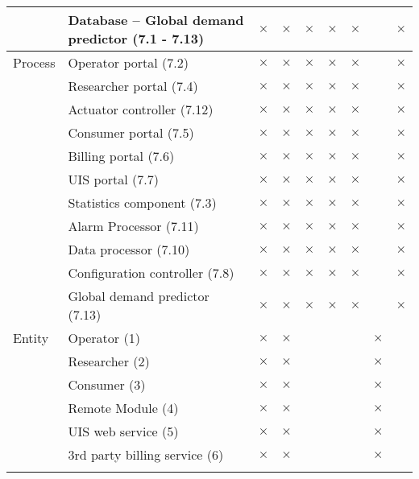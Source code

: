 \begin{longtable}{p{2.3cm} p{9cm} p{0.2cm} p{0.2cm} p{0.2cm} p{0.2cm}p{0.2cm} p{0.2cm} p{0.2cm} }
			&  Database -- Global demand predictor (7.1 - 7.13) & $\times$ & $\times$ & $\times$& $\times$ &  $\times$ & & $\times$\\		   
\hline
Process & Operator portal (7.2) & $\times$ & $\times$ & $\times$& $\times$ &  $\times$ & & $\times$\\
        & Researcher portal (7.4) & $\times$ & $\times$ & $\times$& $\times$ &  $\times$ & & $\times$\\
        & Actuator controller (7.12) & $\times$ & $\times$ & $\times$& $\times$ &  $\times$ & & $\times$\\
        & Consumer portal (7.5) & $\times$ & $\times$ & $\times$& $\times$ &  $\times$ & & $\times$\\
        & Billing portal (7.6) & $\times$ & $\times$ & $\times$& $\times$ &  $\times$ & & $\times$\\
        & UIS portal (7.7) & $\times$ & $\times$ & $\times$& $\times$ &  $\times$ & & $\times$\\
        & Statistics component (7.3) & $\times$ & $\times$ & $\times$& $\times$ &  $\times$ & & $\times$\\
        & Alarm Processor (7.11) & $\times$ & $\times$ & $\times$& $\times$ &  $\times$ & & $\times$\\
        & Data processor (7.10) & $\times$ & $\times$ & $\times$& $\times$ &  $\times$ & & $\times$\\
        & Configuration controller (7.8) & $\times$ & $\times$ & $\times$& $\times$ &  $\times$ & & $\times$\\
        & Global demand predictor (7.13) & $\times$ & $\times$ & $\times$& $\times$ &  $\times$ & & $\times$\\
Entity 	& Operator (1) & $\times$ & $\times$ & & &  & $\times$ & \\
	& Researcher (2) & $\times$ & $\times$ & & &  & $\times$ & \\
	& Consumer (3) & $\times$ & $\times$ & & &  & $\times$ & \\
	& Remote Module (4) & $\times$ & $\times$ & & &  & $\times$ & \\
	& UIS web service (5) & $\times$ & $\times$ & & &  & $\times$ & \\
	& 3rd party billing service (6) & $\times$ & $\times$ & & &  & $\times$ & \\
\hline\hline
\caption{ \label{table:LINDDUN_mapping_MUCs}}
\end{longtable}


